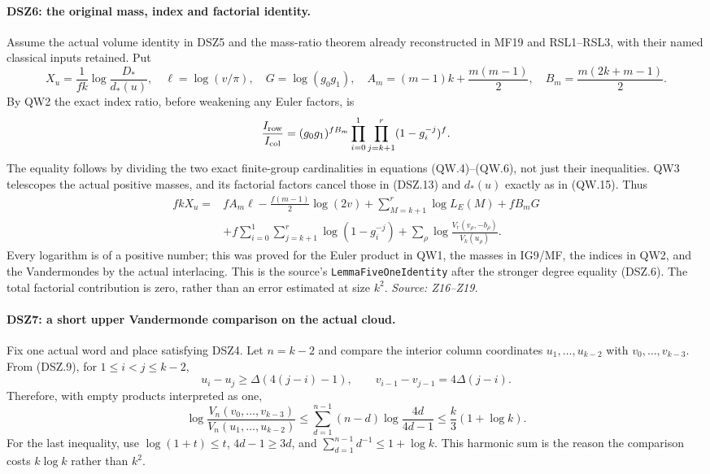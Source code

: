 \paragraph{DSZ6: the original mass, index and factorial identity.}
\label{claim:DSZ6}
Assume the actual volume identity in DSZ5 and the mass-ratio theorem
already reconstructed in MF19 and RSL1--RSL3, with their named
classical inputs retained. Put
\[
 X_u=\frac1{fk}\log\frac{D_*}{d_*(u)},\quad
 \ell=\log(v/\pi),\quad G=\log(g_0g_1),\quad
 A_m=(m-1)k+\frac{m(m-1)}2,\quad
 B_m=\frac{m(2k+m-1)}2.
\]
By QW2 the exact index ratio, before weakening any Euler factors, is
\[
 \frac{I_{\rm row}}{I_{\rm col}}
  =(g_0g_1)^{fB_m}
       \prod_{i=0}^1\prod_{j=k+1}^{r}(1-g_i^{-j})^f.
\]
The equality follows by dividing the two exact finite-group
cardinalities in equations (QW.4)--(QW.6), not just their inequalities.
QW3 telescopes the actual positive masses, and its factorial
factors cancel those in (DSZ.13) and $d_*(u)$ exactly as in
(QW.15). Thus
\begin{align*}
 fkX_u={}&fA_m\ell-\frac{f(m-1)}2\log(2v)
     +\sum_{M=k+1}^{r}\log L_E(M)+fB_mG\\
 &+f\sum_{i=0}^1\sum_{j=k+1}^{r}\log(1-g_i^{-j})
     +\sum_\rho\log\frac{V_r(v_\rho,-b_\rho)}{V_k(u_\rho)}.
                                                               \tag{DSZ.14}
\end{align*}
Every logarithm is of a positive number; this was proved for the
Euler product in QW1, the masses in IG9/MF, the indices in QW2,
and the Vandermondes by the actual interlacing.
This is the source's \texttt{LemmaFiveOneIdentity} after the
stronger degree equality (DSZ.6). The total factorial contribution
is zero, rather than an error estimated at size $k^2$.
\emph{Source: Z16--Z19.}

\paragraph{DSZ7: a short upper Vandermonde comparison on the actual cloud.}
\label{claim:DSZ7}
Fix one actual word and place satisfying DSZ4. Let $n=k-2$ and
compare the interior column coordinates $u_1,\ldots,u_{k-2}$
with $v_0,\ldots,v_{k-3}$. From (DSZ.9), for $1\le i<j\le k-2$,
\[
 u_i-u_j\ge\Delta(4(j-i)-1),\qquad
 v_{i-1}-v_{j-1}=4\Delta(j-i).
\]
Therefore, with empty products interpreted as one,
\[
 \log\frac{V_n(v_0,\ldots,v_{k-3})}
               {V_n(u_1,\ldots,u_{k-2})}
 \le\sum_{d=1}^{n-1}(n-d)\log\frac{4d}{4d-1}
 \le\frac{k}{3}(1+\log k).                                  \tag{DSZ.15}
\]
For the last inequality, use
$\log(1+t)\le t$, $4d-1\ge3d$, and
$\sum_{d=1}^{n-1}d^{-1}\le1+\log k$.
This harmonic sum is the reason the comparison costs $k\log k$
rather than $k^2$.

